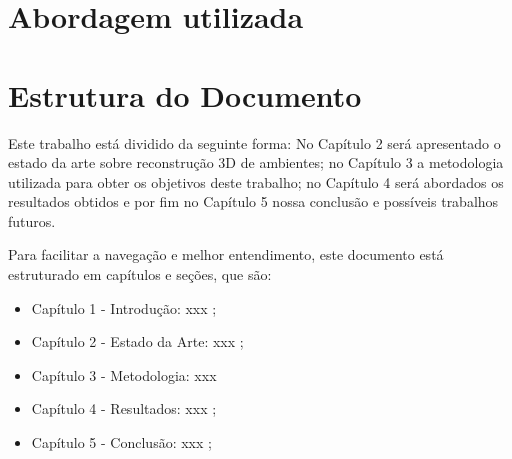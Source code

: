 \section{Abordagem utilizada}

\section{Estrutura do Documento}


Este trabalho está dividido da seguinte forma: No Capítulo 2 será apresentado o estado da arte sobre reconstrução 3D de ambientes; no Capítulo 3 a metodologia utilizada para obter os objetivos deste trabalho; no Capítulo 4 será abordados os resultados obtidos e por fim no Capítulo 5 nossa conclusão e possíveis trabalhos futuros.


Para facilitar a navegação e melhor entendimento, este documento está
estruturado em capítulos e seções, que são:
\begin{itemize}
\item {Capítulo 1 - Introdução}: xxx \cite{Yu:2004:ESG:1015090.1015207};
\item {Capítulo 2 - Estado da Arte}: xxx \cite{Cormen:2009};
\item {Capítulo 3 - Metodologia}: xxx \cite{Weicker:1984:DSS:358274.358283}
\item {Capítulo 4 - Resultados}: xxx \cite{IEEE_802_11:6178212};
\item {Capítulo 5 - Conclusão}: xxx \cite{Linux:402081};
\end{itemize}